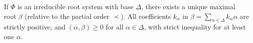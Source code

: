 If $\Phi$ is an irreducible root system with base $\Delta$, there exists a unique maximal root $\beta$ (relative to the partial order $\prec$). All coefficients $k_\alpha$ in $\beta = \sum_{\alpha \in \Delta} k_\alpha \alpha$ are strictly positive, and $(\alpha, \beta) \geq 0$ for all $\alpha \in \Delta$, with strict inequality for at least one $\alpha$.

